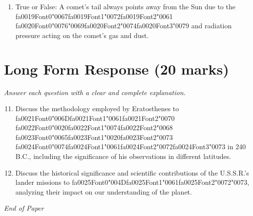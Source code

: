 \documentclass[12pt]{article}
\begin{document}
\begin{enumerate}[label=\arabic*.]
\item True or False: A comet's tail always points away from the Sun due to the {\csname fa0019Font0\endcsname\char"0067}{\csname fa0019Font1\endcsname\char"0072}{\csname fa0019Font2\endcsname\char"0061} {\csname fa0020Font0\endcsname\char"0076}{\char"0069}{\csname fa0020Font2\endcsname\char"0074}{\csname fa0020Font3\endcsname\char"0079} and radiation pressure acting on the comet's gas and dust.
\end{enumerate}

\section*{Long Form Response (20 marks)}
\textit{Answer each question with a clear and complete explanation.}
\begin{enumerate}[label=\arabic*.]
\setcounter{enumi}{10}
\item Discuss the methodology employed by Eratosthenes to {\csname fa0021Font0\endcsname\char"006D}{\csname fa0021Font1\endcsname\char"0061}{\csname fa0021Font2\endcsname\char"0070} {\csname fa0022Font0\endcsname\char"0020}{\csname fa0022Font1\endcsname\char"0074}{\csname fa0022Font2\endcsname\char"0068} {\csname fa0023Font0\endcsname\char"0065}{\csname fa0023Font1\endcsname\char"0020}{\csname fa0023Font2\endcsname\char"0073} {\csname fa0024Font0\endcsname\char"0074}{\csname fa0024Font1\endcsname\char"0061}{\csname fa0024Font2\endcsname\char"0072}{\csname fa0024Font3\endcsname\char"0073} in 240 B.C.,
including the significance of his observations in different latitudes.
\item Discuss the historical significance and scientific contributions of the U.S.S.R.'s lander
missions to {\csname fa0025Font0\endcsname\char"004D}{\csname fa0025Font1\endcsname\char"0061}{\csname fa0025Font2\endcsname\char"0072}{\char"0073}, analyzing their impact on our understanding of the planet.
\end{enumerate}

\vfill
\noindent\textit{End of Paper}
\end{document}
